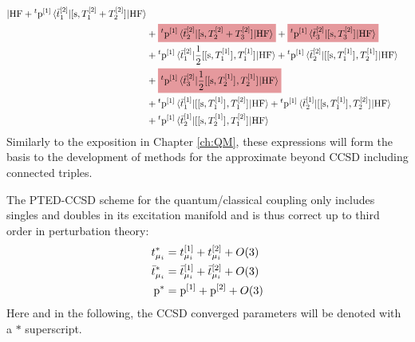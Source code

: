 \begin{equation}
\begin{aligned}
{    | \mathrm{HF}}
    +
    {}^t\p^{[1]}
    \braket{\tbar{1}^{[2]} | \commutator{\s}{T_1^{[2]} + T_2^{[2]}} |
    \mathrm{HF}} \\
    &+
    \highlight{PMS1797}{
    {}^t\p^{[1]}
    \braket{\tbar{2}^{[2]} | \commutator{\s}{T_2^{[2]} + T_3^{[2]}} | \mathrm{HF}}
    }
    +
    \highlight{PMS1797}{
    {}^t\p^{[1]}
    \braket{\tbar{3}^{[2]} | \commutator{\s}{T_3^{[2]}} | \mathrm{HF}}
    } \\
    &+
    {}^t\p^{[1]}
    \braket{\tbar{1}^{[2]} |
    \frac{1}{2}\commutator{\commutator{\s}{T_1^{[1]}}}{T_1^{[1]}}
    | \mathrm{HF}}
    +
    {}^t\p^{[1]}
    \braket{\tbar{2}^{[2]} |
    \commutator{\commutator{\s}{T_1^{[1]}}}{T_2^{[1]}}
    | \mathrm{HF}} \\
    &+
    \highlight{PMS1797}{
    {}^t\p^{[1]}
    \braket{\tbar{3}^{[2]} |
    \frac{1}{2}\commutator{\commutator{\s}{T_2^{[1]}}}{T_2^{[1]}}
    | \mathrm{HF}}
    } \\
    &+ {}^t\p^{[1]}
    \braket{\tbar{1}^{[1]} |
    \commutator{\commutator{\s}{T_1^{[1]}}}{T_1^{[2]}}
    | \mathrm{HF}}
    + {}^t\p^{[1]}
    \braket{\tbar{2}^{[1]} |
    \commutator{\commutator{\s}{T_1^{[1]}}}{T_2^{[2]}}
    | \mathrm{HF}} \\
    &+ {}^t\p^{[1]}
    \braket{\tbar{2}^{[1]} |
    \commutator{\commutator{\s}{T_2^{[1]}}}{T_1^{[2]}}
    | \mathrm{HF}}
  \end{aligned}
\end{equation}
Similarly to the exposition in Chapter \ref{ch:QM}, these expressions
will form the basis to the development of methods for the approximate
beyond \acrshort*{CCSD} including connected triples.

The \acrshort{PTED}-\acrshort{CCSD} scheme for the quantum/classical coupling
only includes singles and doubles in its excitation manifold and is thus
correct up to third order in perturbation theory:
\begin{subequations}
  \begin{align}
    t_{\mu_i}^{*} &= t_{\mu_i}^{[1]} + t_{\mu_i}^{[2]} + O(3)
    \label{eq:tamp-star} \\
    \bar{t}_{\mu_i}^{*} &= \bar{t}_{\mu_i}^{[1]} + \bar{t}_{\mu_i}^{[2]} + O(3)
    \label{eq:tbar-star} \\
    \mathrm{p}^{*} &= \mathrm{p}^{[1]} + \mathrm{p}^{[2]} + O(3)
    \label{eq:p-star}
  \end{align}
\end{subequations}
Here and in the following, the \acrshort{CCSD} converged parameters will
be denoted with a $*$ superscript.

